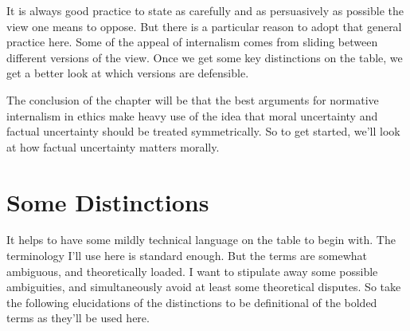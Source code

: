 \documentclass[
  10pt,
  letterpaper,
  twoside]{scrbook}
\begin{document}
It is always good practice to state as carefully and as persuasively as
possible the view one means to oppose. But there is a particular reason
to adopt that general practice here. Some of the appeal of internalism
comes from sliding between different versions of the view. Once we get
some key distinctions on the table, we get a better look at which
versions are defensible.

The conclusion of the chapter will be that the best arguments for
normative internalism in ethics make heavy use of the idea that moral
uncertainty and factual uncertainty should be treated symmetrically. So
to get started, we'll look at how factual uncertainty matters morally.

\section{Some Distinctions}\label{somedistinctions}

It helps to have some mildly technical language on the table to begin
with. The terminology I'll use here is standard enough. But the terms
are somewhat ambiguous, and theoretically loaded. I want to stipulate
away some possible ambiguities, and simultaneously avoid at least some
theoretical disputes. So take the following elucidations of the
distinctions to be definitional of the bolded terms as they'll be used
here.
\end{document}
